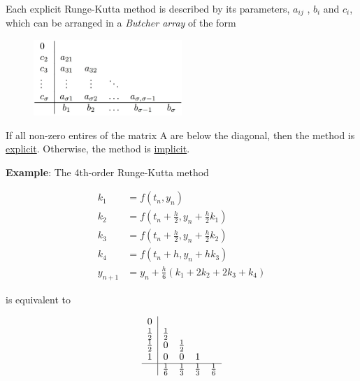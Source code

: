 Each explicit Runge-Kutta method is described by its parameters, $a_{ij}$ , $b_i$ and $c_i$, which can be arranged in a \textit{Butcher array} of the form

\begin{figure}[H]
    \centering
    \includegraphics[width=0.5\textwidth]{images/butcher.jpg}
    \label{fig:butcher}
\end{figure}

If all non-zero entires of the matrix A are below the diagonal, then the method is \underline{explicit}. Otherwise, the method is \underline{implicit}.

\textbf{Example}: The 4th-order Runge-Kutta method

\begin{equation}
    \begin{aligned}
        k_{1} &=f\left(t_{n}, y_{n}\right) \\
        k_{2} &=f\left(t_{n}+\frac{h}{2}, y_{n}+\frac{h}{2} k_{1}\right) \\
        k_{3} &=f\left(t_{n}+\frac{h}{2}, y_{n}+\frac{h}{2} k_{2}\right) \\
        k_{4} &=f\left(t_{n}+h, y_{n}+h k_{3}\right) \\
        y_{n+1} &=y_{n}+\frac{h}{6}\left(k_{1}+2 k_{2}+2 k_{3}+k_{4}\right)
    \end{aligned}
\end{equation}

is equivalent to

\begin{equation}
    \begin{array}{c|cccc}
    0 & & & & \\
    \frac{1}{2} & \frac{1}{2} & & & \\
    \frac{1}{2} & 0 & \frac{1}{2} & & \\
    1 & 0 & 0 & 1 & \\
    \hline & \frac{1}{6} & \frac{1}{3} & \frac{1}{3} & \frac{1}{6}
    \end{array}
\end{equation}

\vspace{0.25cm}

